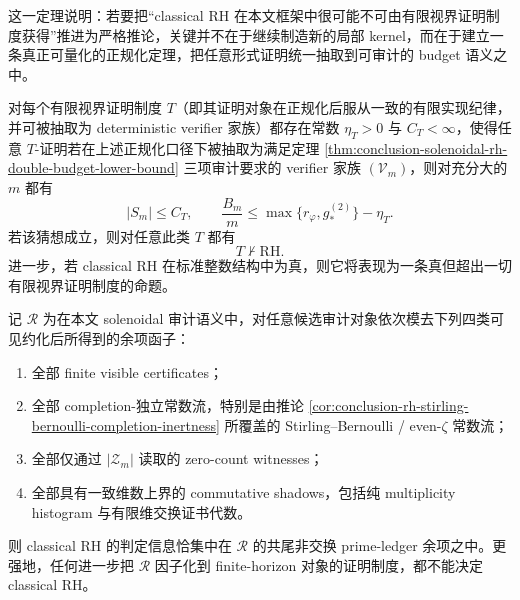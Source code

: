 这一定理说明：若要把“classical RH 在本文框架中很可能不可由有限视界证明制度获得”推进为严格推论，关键并不在于继续制造新的局部 kernel，而在于建立一条真正可量化的正规化定理，把任意形式证明统一抽取到可审计的 budget 语义之中。

\begin{conjecture}\label{conj:conclusion-solenoidal-rh-quantitative-independence}
对每个有限视界证明制度 \(T\)（即其证明对象在正规化后服从一致的有限实现纪律，并可被抽取为 deterministic verifier 家族）都存在常数 \(\eta_T>0\) 与 \(C_T<\infty\)，使得任意 \(T\)-证明若在上述正规化口径下被抽取为满足定理 \ref{thm:conclusion-solenoidal-rh-double-budget-lower-bound} 三项审计要求的 verifier 家族 \((\mathcal V_m)\)，则对充分大的 \(m\) 都有
\[
|S_m|\le C_T,
\qquad
\frac{B_m}{m}\le \max\!\bigl\{r_\varphi,g_*^{(2)}\bigr\}-\eta_T.
\]
若该猜想成立，则对任意此类 \(T\) 都有
\[
T\nvdash \mathrm{RH}.
\]
进一步，若 classical RH 在标准整数结构中为真，则它将表现为一条真但超出一切有限视界证明制度的命题。
\end{conjecture}

\begin{conjecture}[RH 临界数据的共尾非交换余项猜想]\label{conj:conclusion-rh-cofinal-noncommutative-prime-ledger-remainder}
记 \(\mathcal R\) 为在本文 solenoidal 审计语义中，对任意候选审计对象依次模去下列四类可见约化后所得到的余项函子：
\begin{enumerate}
  \item 全部 finite visible certificates；
  \item 全部 completion-独立常数流，特别是由推论 \ref{cor:conclusion-rh-stirling-bernoulli-completion-inertness} 所覆盖的 Stirling--Bernoulli / even-\(\zeta\) 常数流；
  \item 全部仅通过 \(|\mathcal Z_m|\) 读取的 zero-count witnesses；
  \item 全部具有一致维数上界的 commutative shadows，包括纯 multiplicity histogram 与有限维交换证书代数。
\end{enumerate}
则 classical RH 的判定信息恰集中在 \(\mathcal R\) 的共尾非交换 prime-ledger 余项之中。更强地，任何进一步把 \(\mathcal R\) 因子化到 finite-horizon 对象的证明制度，都不能决定 classical RH。
\end{conjecture}

